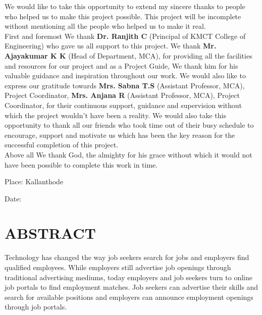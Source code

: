 \documentclass[a4paper,12pt]{report}
\begin{document}
\vspace*{20pt}

We would like to take this opportunity to extend my sincere thanks to people who helped us to make
this project possible. This project will be incomplete without mentioning all the people who helped
us to make it real.\\

\hspace{12pt} First and foremost We thank { \bf Dr. Ranjith C } (Principal of KMCT College of Engineering) who
gave us all support to this project. We thank { \bf Mr. Ajayakumar K K} (Head of Department, MCA), for providing all the facilities and resources for our project and as a Project Guide, We thank him for his valuable guidance and inspiration throughout our work. We would also like to express our
gratitude towards { \bf Mrs. Sabna T.S }(Assistant Professor, MCA), Project Coordinator, { \bf Mrs. Anjana R }(Assistant Professor, MCA), Project Coordinator, for their
continuous support, guidance and supervision without which the project wouldn’t have been a reality. We would also take this
opportunity to thank all our friends who took time out of their busy schedule to encourage, support
and motivate us which has been the key reason for the successful completion of this project.\\ 
 
Above all We thank God, the almighty for his grace without which it would not have been
possible to complete this work in time.	

\begin{center}\vspace*{40pt}
	Place: Kallanthode  \hspace*{335pt}
\end{center}

\begin{center}\vspace*{10pt}
	Date:   \hspace*{400pt}
\end{center}

\pagebreak


\section*{\centering \bf \large ABSTRACT}
\vspace*{20pt}
\par
\hspace*{12pt}Technology has changed the way job seekers search for jobs and employers
find qualified employees. While employers still advertise job openings through
traditional advertising mediums, today employers and job seekers turn to online
job portals to find employment matches. Job seekers can advertise their skills and
search for available positions and employers can announce employment openings
through job portals.\\
\end{document}
